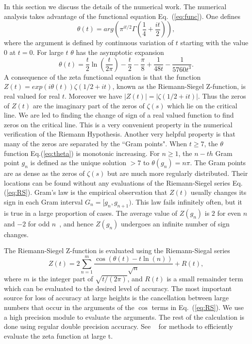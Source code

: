 \documentclass[twoside]{article}
\begin{document}
In this section we discuss the details of the numerical work. 
The numerical analysis takes advantage of the functional 
equation Eq.~(\ref{eq:func}).
One defines
\begin{equation}
\theta(t) = arg (\pi^{it/2} \Gamma(\frac{1}{4} + \frac{it}{2})), 
\label{eq:theta}
\end{equation}
where the argument is defined by continuous variation of $t$ starting with the value $0$ at $t = 0$.
For large $t$ $\theta$ has the asymptotic expansion
\begin{equation}
\theta(t) = \frac{t}{2}\ln (\frac{t}{2\pi}) - \frac{t}{2} - \frac{\pi}{8} + \frac{1}{48t} - \frac{1}{5760t^3}. 
\label{eq:thetaAsymptotic}
\end{equation}
A consequence of the zeta functional equation is that the function 
$Z(t)=exp(i\theta(t))\zeta(1/2 +it)$,
known as the Riemann-Siegel Z-function, is real valued for real $t$. 
Moreover we have $|Z(t)| = |\zeta(1/2+it)|$. Thus the zeros of $Z(t)$ are the imaginary part of the zeros 
of $\zeta(s)$ which lie on the critical line. We are led to finding the change of sign 
of a real valued function 
to find zeros on the critical line. This is a very convenient property in the numerical verification 
of the Riemann Hypothesis.
Another very helpful property is that many of the zeros are separated by the
``Gram points".  When $t \ge 7$, the $\theta$ function Eq.(\ref{eq:theta}) is monotonic increasing. 
For $n \ge 1$, the $n-th$ Gram point $g_n$ is defined as the unique solution $> 7$ to
$\theta (g_n) = n\pi$.
The Gram points are as dense as the zeros of $\zeta(s)$ but are much more regularly distributed.
Their locations can be found without any evaluations of the Riemann-Siegel series Eq.(\ref{eq:RS}).
Gram's law is the empirical observation that $Z(t)$ usually changes its sign in each Gram interval 
$G_n = [g_n,g_{n+1})$. 
This law fails infinitely often, but it is true in a large proportion of cases.
The average value of $Z(g_n)$ is $2$ for even $n$ and $-2$ for odd $n$~\cite{Titchmarsh 1986},
and hence $Z(g_n)$ undergoes an infinite number of sign changes.


The Riemann-Siegel Z-function is evaluated using the Riemann-Siegal series
\begin{equation}
Z(t) = 2\sum^{m}_{n=1}\frac{\cos(\theta(t) - t \ln (n))}{\sqrt{n}} + R(t), 
\label{eq:RS}
\end{equation}
where $m$ is the integer part of $\sqrt{t/(2\pi)}$, and $R(t)$ is a small remainder
term which can be evaluated to the desired level of accuracy. The most important 
source for loss of accuracy at large heights is the cancellation between
large numbers that occur in the arguments of the $\cos$ terms in Eq.~(\ref{eq:RS}). We 
use a high precision module to evaluate the arguments. The rest of the calculation
is done using regular double precision accuracy. See ~\cite{hiary,gourdon,Odlyzko(1989)} for methods to efficiently evaluate the zeta function at large t.
\end{document}
